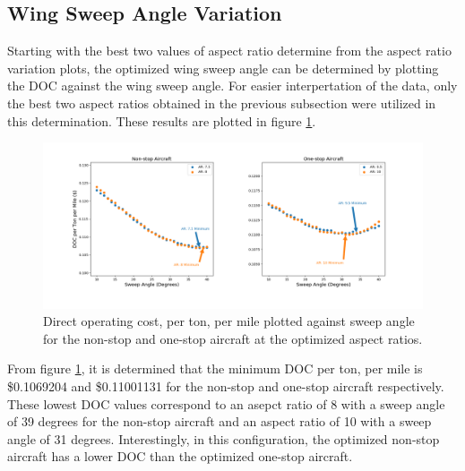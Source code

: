 \documentclass{article}
\begin{document}
    \subsection{Wing Sweep Angle Variation}
        \begin{flushleft}
            Starting with the best two values of aspect ratio determine from the
            aspect ratio variation plots, the optimized wing sweep angle can be
            determined by plotting the DOC against the wing sweep angle. For
            easier interpertation of the data, only the best two aspect ratios
            obtained in the previous subsection were utilized in this
            determination. These results are plotted in figure \ref{fig:AR}.

            \begin{figure}[ht]
                \centering
                \includegraphics[scale=0.4]{AR Plot.PNG}
                \caption{Direct operating cost, per ton, per mile plotted against sweep angle for the non-stop and one-stop aircraft at the optimized aspect ratios.}
                \label{fig:AR}
            \end{figure}

            From figure \ref{fig:AR}, it is determined that the minimum DOC per
            ton, per mile is \$0.1069204 and \$0.11001131 for the non-stop and
            one-stop aircraft respectively. These lowest DOC values correspond
            to an asepct ratio of 8 with a sweep angle of 39 degrees for the
            non-stop aircraft and an aspect ratio of 10 with a sweep angle of 31
            degrees. Interestingly, in this configuration, the optimized
            non-stop aircraft has a lower DOC than the optimized one-stop
            aircraft.

        \end{flushleft}
\end{document}
